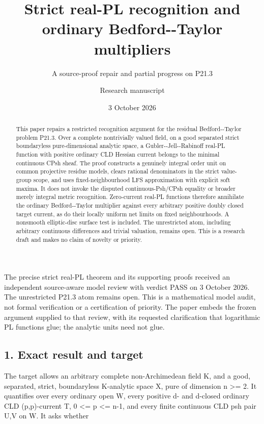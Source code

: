 \documentclass[
  11pt,
]{article}
\title{Strict real-PL recognition and ordinary Bedford-\/-Taylor
multipliers}
\subtitle{A source-proof repair and partial progress on P21.3}
\author{Research manuscript}
\date{3 October 2026}
\begin{document}
\maketitle
\begin{abstract}
This paper repairs a restricted recognition argument for the residual
Bedford-\/-Taylor problem P21.3. Over a complete nontrivially valued
field, on a good separated strict boundaryless pure-dimensional analytic
space, a Gubler-\/-Jell-\/-Rabinoff real-PL function with positive
ordinary CLD Hessian current belongs to the minimal continuous CPsh
sheaf. The proof constructs a genuinely integral order unit on common
projective residue models, clears rational denominators in the strict
value-group scope, and uses fixed-neighbourhood LFS approximation with
explicit soft maxima. It does not invoke the disputed
continuous-Psh/CPsh equality or broader merely integral metric
recognition. Zero-current real-PL functions therefore annihilate the
ordinary Bedford-\/-Taylor multiplier against every arbitrary positive
doubly closed target current, as do their locally uniform net limits on
fixed neighbourhoods. A nonsmooth elliptic-disc surface test is
included. The unrestricted atom, including arbitrary continuous
differences and trivial valuation, remains open. This is a research
draft and makes no claim of novelty or priority.
\end{abstract}

The precise strict real-PL theorem and its supporting proofs received an
independent source-aware model review with verdict PASS on 3 October 2026.
The unrestricted P21.3 atom remains open. This is a mathematical model audit,
not formal verification or a certification of priority. The paper embeds the
frozen argument supplied to that review, with its requested clarification
that logarithmic PL functions glue; the analytic units need not glue.

\subsection{1. Exact result and target}\label{exact-result-and-target}

The target allows an arbitrary complete non-Archimedean field K, and a
good, separated, strict, boundaryless K-analytic space X, pure of
dimension n \textgreater= 2. It quantifies over every ordinary open W,
every positive d\textquotesingle- and
d\textquotesingle\textquotesingle-closed ordinary CLD (p,p)-current T, 0
\textless= p \textless= n-1, and every finite continuous CLD psh pair
U,V on W. It asks whether
\end{document}
